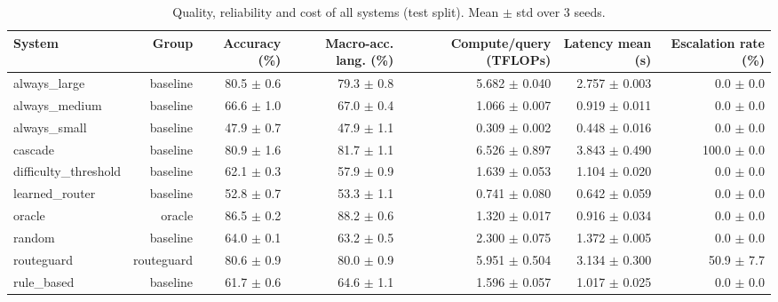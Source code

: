 \begin{table}[t]
\centering
\small
\caption{Quality, reliability and cost of all systems (test split). Mean $\pm$ std over 3 seeds.}
\label{tab:main_results}
\begin{tabular}{lrrrrrr}
\toprule
System & Group & Accuracy (\%) & Macro-acc. lang. (\%) & Compute/query (TFLOPs) & Latency mean (s) & Escalation rate (\%) \\
\midrule
always\_large & baseline & 80.5 $\pm$ 0.6 & 79.3 $\pm$ 0.8 & 5.682 $\pm$ 0.040 & 2.757 $\pm$ 0.003 & 0.0 $\pm$ 0.0 \\
always\_medium & baseline & 66.6 $\pm$ 1.0 & 67.0 $\pm$ 0.4 & 1.066 $\pm$ 0.007 & 0.919 $\pm$ 0.011 & 0.0 $\pm$ 0.0 \\
always\_small & baseline & 47.9 $\pm$ 0.7 & 47.9 $\pm$ 1.1 & 0.309 $\pm$ 0.002 & 0.448 $\pm$ 0.016 & 0.0 $\pm$ 0.0 \\
cascade & baseline & 80.9 $\pm$ 1.6 & 81.7 $\pm$ 1.1 & 6.526 $\pm$ 0.897 & 3.843 $\pm$ 0.490 & 100.0 $\pm$ 0.0 \\
difficulty\_threshold & baseline & 62.1 $\pm$ 0.3 & 57.9 $\pm$ 0.9 & 1.639 $\pm$ 0.053 & 1.104 $\pm$ 0.020 & 0.0 $\pm$ 0.0 \\
learned\_router & baseline & 52.8 $\pm$ 0.7 & 53.3 $\pm$ 1.1 & 0.741 $\pm$ 0.080 & 0.642 $\pm$ 0.059 & 0.0 $\pm$ 0.0 \\
oracle & oracle & 86.5 $\pm$ 0.2 & 88.2 $\pm$ 0.6 & 1.320 $\pm$ 0.017 & 0.916 $\pm$ 0.034 & 0.0 $\pm$ 0.0 \\
random & baseline & 64.0 $\pm$ 0.1 & 63.2 $\pm$ 0.5 & 2.300 $\pm$ 0.075 & 1.372 $\pm$ 0.005 & 0.0 $\pm$ 0.0 \\
routeguard & routeguard & 80.6 $\pm$ 0.9 & 80.0 $\pm$ 0.9 & 5.951 $\pm$ 0.504 & 3.134 $\pm$ 0.300 & 50.9 $\pm$ 7.7 \\
rule\_based & baseline & 61.7 $\pm$ 0.6 & 64.6 $\pm$ 1.1 & 1.596 $\pm$ 0.057 & 1.017 $\pm$ 0.025 & 0.0 $\pm$ 0.0 \\
\bottomrule
\end{tabular}
\end{table}
